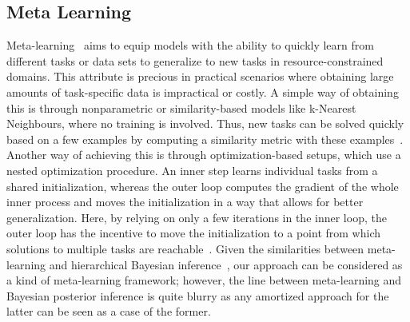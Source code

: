 \subsection{Meta Learning}
Meta-learning~\citep{hospedales2022metareview} aims to equip models with the ability to quickly learn from different tasks or data sets to generalize to new tasks in resource-constrained domains. This attribute is precious in practical scenarios where obtaining large amounts of task-specific data is impractical or costly. A simple way of obtaining this is through nonparametric or similarity-based models like k-Nearest Neighbours, where no training is involved. Thus, new tasks can be solved quickly based on a few examples by computing a similarity metric with these examples~\citep{koch2015siamese,vinyals2016matching,sung2018learning}. Another way of achieving this is through optimization-based setups, which use a nested optimization procedure. An inner step learns individual tasks from a shared initialization, whereas the outer loop computes the gradient of the whole inner process and moves the initialization in a way that allows for better generalization. Here, by relying on only a few iterations in the inner loop, the outer loop has the incentive to move the initialization to a point from which solutions to multiple tasks are reachable~\citep{finn2017model}. Given the similarities between meta-learning and hierarchical Bayesian inference~\citep{grant2018recasting}, our approach can be considered as a kind of meta-learning framework; however, the line between meta-learning and Bayesian posterior inference is quite blurry as any amortized approach for the latter can be seen as a case of the former.

% 
